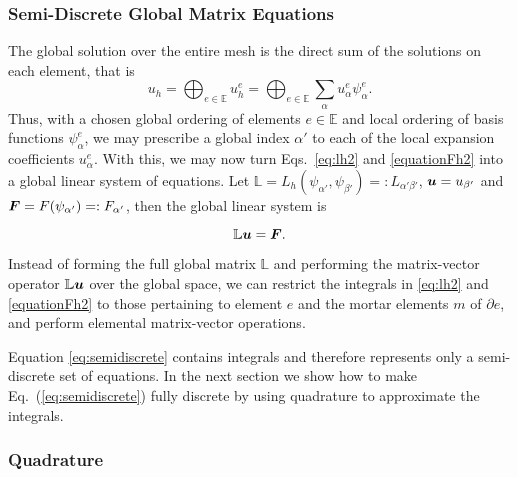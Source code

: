   \subsubsection{Semi-Discrete Global Matrix Equations}

The global solution over the entire mesh is the direct sum of the solutions on each element, that is
%
\begin{equation}\label{eq:GlobalExpansion}
  u_h = \bigoplus_{e \in \mathbb{E}} u^e_h = \bigoplus_{e \in \mathbb{E}} \sum_{\alpha}u^e_\alpha\psi^e_\alpha.
\end{equation}
%
Thus, with a chosen global ordering of elements $e \in \mathbb{E}$ and local ordering of basis functions $\psi^e_\alpha$, we may prescribe a global index $\alpha'$ to each of the local expansion coefficients $u^e_\alpha$.
With this, we may now turn Eqs.~\eqref{eq:lh2} and \eqref{equationFh2} into a global linear system of equations. Let $\mathbb{L} = L_h(\psi_{\alpha'},\psi_{\beta'}) =: L_{\alpha'\beta'}$, $\boldsymbol{u} = u_{\beta'}$ and $\boldsymbol{F} = F(\psi_{\alpha'}) =: F_{\alpha'}$, then the global linear system is

\begin{equation}\label{eq:semidiscrete}
\mathbb{L} \boldsymbol{u} = \boldsymbol{F}.
\end{equation}

Instead of forming the full global matrix $\mathbb{L}$ and performing the matrix-vector operator $\mathbb{L} \boldsymbol{u}$ over the global space, we can restrict the integrals in  \eqref{eq:lh2} and \eqref{equationFh2} to those pertaining to element $e$ and the mortar elements $m$ of $\partial e$, and perform elemental matrix-vector operations.

Equation \ref{eq:semidiscrete} contains integrals and therefore represents only a semi-discrete set of equations. In the next section we show how to make Eq.~(\ref{eq:semidiscrete}) fully discrete by using quadrature to approximate the integrals.

\subsubsection{Quadrature}
\label{sec:quadrature}

